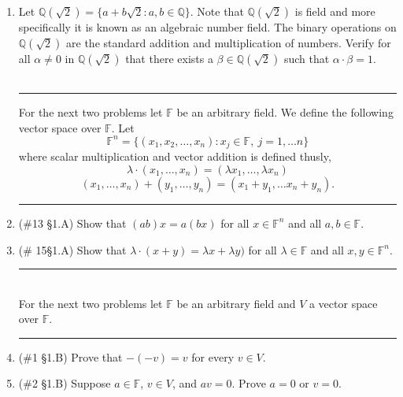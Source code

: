 \documentclass[12pt,letterpaper]{article}
\newcommand{\qq}{\mathbb Q}   %
\theoremstyle{plain}
\theoremstyle{definition}
\begin{document}
\begin{enumerate}[1.]
 \item Let $\qq(\sqrt{2})=\{a+b\sqrt{2} : a,b\in \mathbb{Q}\}$.  Note that $\qq(\sqrt{2})$ is field and more specifically it is known as an algebraic number field. The binary operations on $\qq(\sqrt{2})$ are the standard addition and multiplication of numbers. Verify for all $\alpha\neq 0$ in $\qq(\sqrt{2})$ that there exists a $\beta\in \qq(\sqrt{2})$ such that $\alpha \cdot \beta = 1$. \\
 \ \\
 \hrule
 For the next two problems let $\mathbb{F}$ be an arbitrary field. We define the following vector space over $\mathbb{F}$. Let
\[\mathbb{F}^n=\{(x_1,x_2,\ldots, x_n) : x_j\in \mathbb{F},\ j=1, \ldots n\}\] where scalar multiplication and vector addition is defined thusly, 
\[\lambda \cdot (x_1, \ldots , x_n)=(\lambda x_1, \ldots , \lambda x_n)\]
\[(x_1,\ldots ,x_n)+(y_1,\ldots ,y_n)=(x_1+y_1, \ldots x_n+y_n).\]
\hrule

\item (\#13 \S 1.A) Show that $(ab)x=a(bx)$ for all $x\in \mathbb{F}^n$ and all $a,b\in \mathbb{F}$. \\
\item (\# 15\S 1.A) Show that $\lambda \cdot (x+y)=\lambda x+\lambda y)$ for all $\lambda \in \mathbb{F}$ and all $x,y\in \mathbb{F}^n$. \\
\hrule 
\ \\
For the next two problems let $\mathbb{F}$ be an arbitrary field and $V$ a vector space over $\mathbb{F}$.
\ \\
\hrule 
\item (\#1 \S 1.B) Prove that $-(-v)=v$ for every $v\in V$. 
\item (\#2 \S 1.B) Suppose $a\in \mathbb{F}$, $v\in V$, and $av=0$. Prove $a=0$ or $v=0$. 
\end{enumerate}
\end{document}
